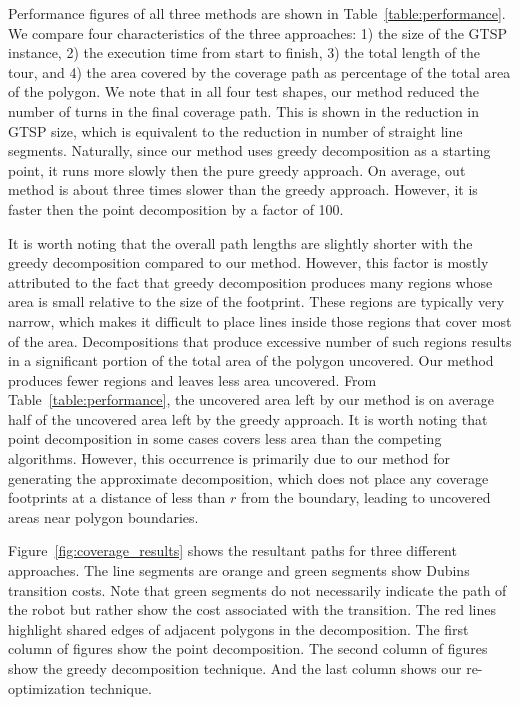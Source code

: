 \documentclass[../main.tex]{subfiles}
\begin{document}
Performance figures of all three methods are shown in Table~\ref{table:performance}. We compare four characteristics of the three approaches: 1) the size of the GTSP instance, 2) the execution time from start to finish, 3) the total length of the tour, and 4) the area covered by the coverage path as percentage of the total area of the polygon. We note that in all four test shapes, our method reduced the number of turns in the final coverage path. This is shown in the reduction in GTSP size, which is equivalent to the reduction in number of straight line segments. Naturally, since our method uses greedy decomposition as a starting point, it runs more slowly then the pure greedy approach. On average, out method is about three times slower than the greedy approach. However, it is faster then the point decomposition by a factor of 100. 

It is worth noting that the overall path lengths are slightly shorter with the greedy decomposition compared to our method. However, this factor is mostly attributed to the fact that greedy decomposition produces many regions whose area is small relative to the size of the footprint. These regions are typically very narrow, which makes it difficult to place lines inside those regions that cover most of the area. Decompositions that produce excessive number of such regions results in a significant portion of the total area of the polygon uncovered. Our method produces fewer regions and leaves less area uncovered. From Table~\ref{table:performance}, the uncovered area left by our method is on average half of the uncovered area left by the greedy approach. It is worth noting that point decomposition in some cases covers less area than the competing algorithms. However, this occurrence is primarily due to our method for generating the approximate decomposition, which does not place any coverage footprints at a distance of less than $r$ from the boundary, leading to uncovered areas near polygon boundaries.

Figure~\ref{fig:coverage_results} shows the resultant paths for three different approaches. The line segments are orange and green segments show Dubins transition costs. Note that green segments do not necessarily indicate the path of the robot but rather show the cost associated with the transition. The red lines highlight shared edges of adjacent polygons in the decomposition. The first column of figures show the point decomposition. The second column of figures show the greedy decomposition technique. And the last column shows our re-optimization technique. 
\end{document}
